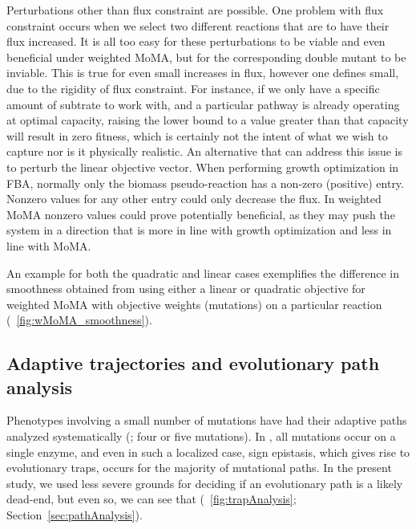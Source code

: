 Perturbations other than flux constraint are possible. One problem
with flux constraint occurs when we select two different reactions
that are to have their flux increased. It is all too easy for these
perturbations to be viable and even beneficial under weighted MoMA,
but for the corresponding double mutant to be inviable. This is true
for even small increases in flux, however one defines small, due to
the rigidity of flux constraint. For instance, if we only have a
specific amount of subtrate to work with, and a particular pathway is
already operating at optimal capacity, raising the lower bound to a
value greater than that capacity will result in zero fitness, which is
certainly not the intent of what we wish to capture nor is it
physically realistic. An alternative that can address this issue is to
perturb the linear objective vector. When performing growth
optimization in FBA, normally only the biomass pseudo-reaction has a
non-zero (positive) entry. Nonzero values for any other entry could
only decrease the flux. In weighted MoMA nonzero values could prove
potentially beneficial, as they may push the system in a direction
that is more in line with growth optimization and less in line with
MoMA.

An example for both the quadratic and linear cases exemplifies the
difference in smoothness obtained from using either a linear or
quadratic objective for weighted MoMA with objective weights (mutations)
on a particular reaction (\Fig~\ref{fig:wMoMA_smoothness}).


\subsection{Adaptive trajectories and evolutionary path analysis}

Phenotypes involving a small number of mutations have had their
adaptive paths analyzed systematically (\citep{Poelwijk2007,Weinreich2006, 
Khan2011, Chou2011}; four or five mutations). In \citet{Weinreich2006}, all
mutations occur on a single enzyme, and even in such a localized case,
sign epistasis, which gives rise to evolutionary traps, occurs for the
majority of mutational paths. In the present study, we used less
severe grounds for deciding if an evolutionary path is a likely
dead-end, but even so, we can see that (\Fig~\ref{fig:trapAnalysis};
\suppOrApp Section~\ref{sec:pathAnalysis}).

\label{fig:trapAnalysis}

